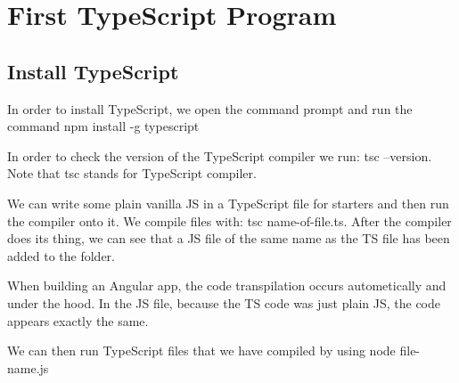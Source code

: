 \chapter{First TypeScript Program}

\section{Install TypeScript}
In order to install TypeScript, we open the command prompt and run the command npm install -g typescript

In order to check the version of the TypeScript compiler we run: tsc --version. Note that tsc stands for TypeScript compiler.

We can write some plain vanilla JS in a TypeScript file for starters and then run the compiler onto it. We compile files with: tsc name-of-file.ts. After the compiler does its thing, we can see that a JS file of the same name as the TS file has been added to the folder.

When building an Angular app, the code transpilation occurs autometically and under the hood. In the JS file, because the TS code was just plain JS, the code appears exactly the same.

We can then run TypeScript files that we have compiled by using node file-name.js